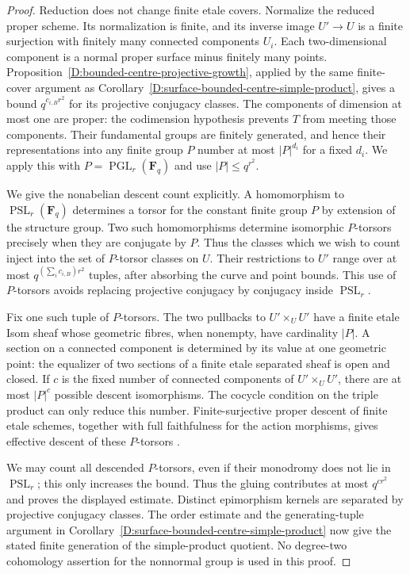 \begin{proof}
Reduction does not change finite etale covers. Normalize the reduced
proper scheme. Its normalization is finite, and its inverse image
$U'\to U$ is a finite surjection with finitely many connected
components $U_i$. Each two-dimensional component is a normal proper
surface minus finitely many points. Proposition~\ref{D:bounded-centre-projective-growth}, applied by
the same finite-cover argument as
Corollary~\ref{D:surface-bounded-centre-simple-product}, gives a bound
$q^{c_{i,B}r^2}$ for its projective conjugacy classes. The components
of dimension at most one are proper: the codimension hypothesis
prevents $T$ from meeting those components. Their fundamental groups
are finitely generated, and hence their representations into any
finite group $P$ number at most $|P|^{d_i}$ for a fixed $d_i$.
We apply this with $P=\operatorname{PGL}_r(\mathbf F_q)$ and use
$|P|\le q^{r^2}$.

We give the nonabelian descent count explicitly. A homomorphism to
$\operatorname{PSL}_r(\mathbf F_q)$ determines a torsor for the
constant finite group $P$ by extension of the structure group.
Two such homomorphisms determine isomorphic $P$-torsors precisely
when they are conjugate by $P$. Thus the classes which we wish to
count inject into the set of $P$-torsor classes on $U$. Their
restrictions to $U'$ range over at most
$q^{(\sum_i c_{i,B})r^2}$ tuples, after absorbing the curve and
point bounds. This use of $P$-torsors avoids replacing projective
conjugacy by conjugacy inside $\operatorname{PSL}_r$.

Fix one such tuple of $P$-torsors. The two pullbacks to
$U'\times_U U'$ have a finite etale Isom sheaf whose geometric
fibres, when nonempty, have cardinality $|P|$. A section on a
connected component is determined by its value at one geometric
point: the equalizer of two sections of a finite etale separated
sheaf is open and closed. If $c$ is the fixed number of connected
components of $U'\times_U U'$, there are at most $|P|^c$ possible
descent isomorphisms. The cocycle condition on the triple product
can only reduce this number. Finite-surjective proper descent of
finite etale schemes, together with full faithfulness for the
action morphisms, gives effective descent of these $P$-torsors
\citep[Expose~IX, Theorem~4.7]{C_SGA1}.

We may count all descended $P$-torsors, even if their monodromy
does not lie in $\operatorname{PSL}_r$; this only increases the
bound. Thus the gluing contributes at most $q^{cr^2}$ and proves
the displayed estimate. Distinct epimorphism kernels are separated
by projective conjugacy classes. The order estimate and the
generating-tuple argument in
Corollary~\ref{D:surface-bounded-centre-simple-product} now give
the stated finite generation of the simple-product quotient.
No degree-two cohomology assertion for the nonnormal group is
used in this proof.
\end{proof}
